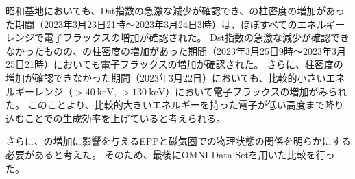 昭和基地においても、Dst指数の急激な減少が確認でき、の柱密度の増加があった期間（2023年3月23日21時〜2023年3月24日3時）は、ほぼすべてのエネルギーレンジで電子フラックスの増加が確認された。
Dst指数の急激な減少が確認できなかったものの、の柱密度の増加があった期間（2023年3月25日9時〜2023年3月25日21時）においても電子フラックスの増加が確認された。
さらに、柱密度の増加が確認できなかった期間（2023年3月22日）においても、比較的小さいエネルギーレンジ（$>40\ \mathrm{keV}$, $>130\ \mathrm{keV}$）において電子フラックスの増加がみられた。
このことより、比較的大きいエネルギーを持った電子が低い高度まで降り込むことでの生成効率を上げていると考えられる。\par

さらに、の増加に影響を与えるEPPと磁気圏での物理状態の関係を明らかにする必要があると考えた。
そのため、最後にOMNI Data Setを用いた比較を行った。


